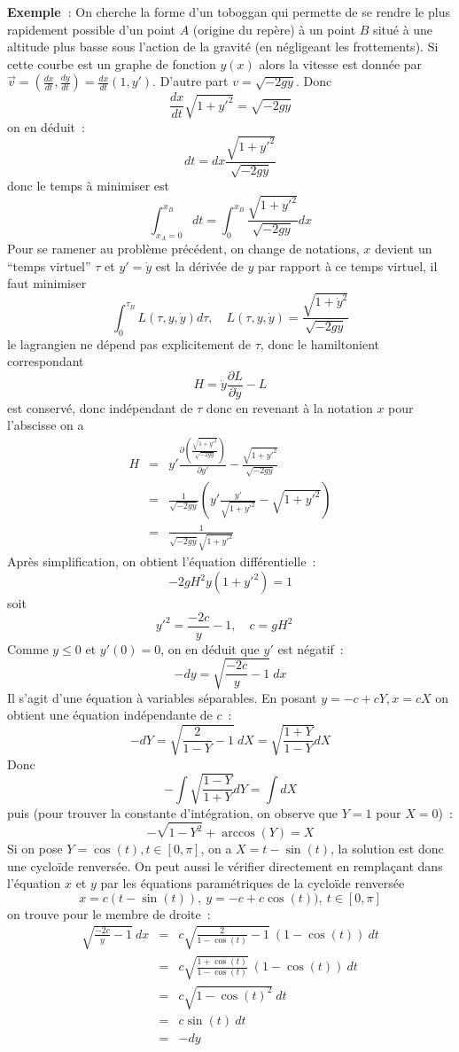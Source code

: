 \documentclass[a4paper,11pt]{article}
\begin{document}
\begin{giacjshere}
{\bf Exemple~}: On cherche la forme d'un toboggan qui permette
de se rendre le plus rapidement possible d'un point $A$ (origine
du rep\`ere) \`a un point $B$ situ\'e \`a une altitude plus basse 
sous l'action de la gravit\'e (en n\'egligeant les frottements). 
Si cette courbe est un graphe de fonction $y(x)$ alors la vitesse
est donn\'ee par 
$\overrightarrow{v}=(\frac{dx}{dt},\frac{dy}{dt})=\frac{dx}{dt}(1,y')$.
D'autre part $v=\sqrt{-2gy}$. Donc
$$ \frac{dx}{dt}\sqrt{1+y'^2}=\sqrt{-2gy}$$
on en d\'eduit~:
$$ dt = dx \frac{\sqrt{1+y'^2}}{\sqrt{-2gy}}$$
donc le temps \`a minimiser est
$$ \int_{x_A=0}^{x_B} dt = \int_0^{x_B}
\frac{\sqrt{1+y'^2}}{\sqrt{-2gy}} dx$$
Pour se ramener au probl\`eme pr\'ec\'edent, 
on change de notations, $x$ devient un ``temps virtuel''
$\tau$ et $y'=\dot{y}$ est la d\'eriv\'ee de $y$ par
rapport \`a ce temps virtuel, il faut minimiser
$$ \int_0^{\tau_B} L(\tau,y,\dot{y}) d\tau, \quad 
L(\tau,y,\dot{y})=\frac{\sqrt{1+\dot{y}^2}}{\sqrt{-2gy}} $$
le lagrangien ne d\'epend pas explicitement de $\tau$, donc le
hamiltonient correspondant
$$ H=\dot{y} \frac{\partial L}{\partial\dot{y}}  - L $$
est conserv\'e, donc ind\'ependant de $\tau$ donc en revenant
\`a la notation $x$ pour l'abscisse on a
\begin{eqnarray*}
 H&=&y'  \frac{ \partial{ \left( \frac{\sqrt{1+y'^2}}{\sqrt{-2gy}}
    \right)} }{\partial y'}- 
\frac{\sqrt{1+y'^2}}{\sqrt{-2gy}}\\
&=& \frac1 {\sqrt{-2gy}} \left( y' \frac{y'}{\sqrt{1+y'^2}} -
  \sqrt{1+y'^2} \right)\\
&=&\frac1 {\sqrt{-2gy} \sqrt{1+y'^2}} 
\end{eqnarray*}
Apr\`es simplification, on obtient l'\'equation diff\'erentielle~:
$$ -2gH^2y (1+y'^2) = 1$$
soit 
$$ y'^2=\frac{-2c}{y}-1, \quad c=gH^2\quad $$
Comme $y\leq 0$ et $y'(0)=0$, on en d\'eduit que $y'$ est n\'egatif~:
$$ -dy = \sqrt{\frac{-2c}{y}-1} \ dx$$
Il s'agit d'une \'equation \`a variables s\'eparables. En posant
$y=-c+cY, x=cX$
on obtient une \'equation ind\'ependante de $c$~:
$$ -dY=\sqrt{\frac{2}{1-Y}-1} \ dX=\sqrt{\frac{1+Y}{1-Y}} dX$$
Donc
$$ -\int \sqrt{\frac{1-Y}{1+Y}} dY = \int dX $$
puis (pour trouver la constante d'int\'egration, on observe que
$Y=1$ pour $X=0$)~:
$$ -\sqrt{1-Y^2}+\arccos(Y)=X$$
Si on pose $Y=\cos(t), t \in [0,\pi]$, on a $X=t - \sin(t)$,
la solution est donc une cyclo\"ide renvers\'ee.
On peut aussi le v\'erifier directement
en rempla\c{c}ant dans l'\'equation $x$ et $y$
par les \'equations param\'etriques de la cyclo\"ide renvers\'ee
$$x=c(t-\sin(t)), \ y=-c+c\cos(t)), \ t \in [0,\pi]$$
on trouve pour le membre de droite~:
\begin{eqnarray*}
\sqrt{\frac{-2c}{y}-1} \ dx &=& c \sqrt{\frac{2}{1-\cos(t)}-1} \
(1-\cos(t)) \ dt\\
&=& c \sqrt{\frac{1+\cos(t)}{1-\cos(t)}} \  (1-\cos(t)) \ dt \\
&=& c \sqrt{1-\cos(t)^2} \ dt\\
&=& c \sin(t) \ dt \\
&=& -dy
\end{eqnarray*}



\end{giacjshere}
\end{document}

